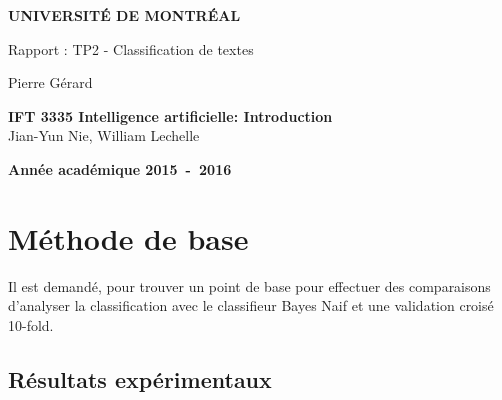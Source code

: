 \documentclass[a4paper,10pt]{article}
\begin{document}
\begin{titlepage}
\begin{center}
\textbf{\textsc{UNIVERSIT\'E DE MONTR\'EAL}}\\
\vfill{}\vfill{}
\begin{center}{\Huge Rapport : TP2 - Classification de textes}\end{center}{\Huge \par}
\begin{center}{\large Pierre Gérard}\end{center}{\Huge \par}
\vfill{}\vfill{} \vfill{}
\begin{center}{\large \textbf{IFT 3335 Intelligence artificielle: Introduction}}\hfill{\\Jian-Yun Nie, William Lechelle}\end{center}{\large\par}
\vfill{}\vfill{}\enlargethispage{3cm}
\textbf{Année académique 2015~-~2016}
\end{center}
\end{titlepage}





\section{Méthode de base}

Il est demandé, pour trouver un point de base pour effectuer des comparaisons d'analyser la classification avec le classifieur Bayes Naif et une validation croisé 10-fold.

\subsection{Résultats expérimentaux}
\end{document}
